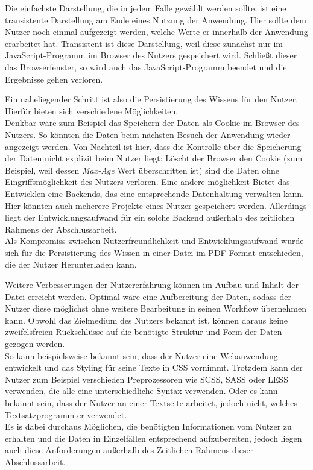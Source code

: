 Die einfachste Darstellung, die in jedem Falle gewählt werden sollte, ist eine transistente Darstellung am Ende eines Nutzung der Anwendung. Hier sollte dem Nutzer noch einmal aufgezeigt werden, welche Werte er innerhalb der Anwendung erarbeitet hat. Transistent ist diese Darstellung, weil diese zunächst nur im JavaScript-Programm im Browser des Nutzers gespeichert wird. Schließt dieser das Browserfenster, so wird auch das JavaScript-Programm beendet und die Ergebnisse gehen verloren.

Ein naheliegender Schritt ist also die Persistierung des Wissens für den Nutzer. Hierfür bieten sich verschiedene Möglichkeiten. \\
Denkbar wäre zum Beispiel das Speichern der Daten als Cookie im Browser des Nutzers. So könnten die Daten beim nächsten Besuch der Anwendung wieder angezeigt werden. Von Nachteil ist hier, dass die Kontrolle über die Speicherung der Daten nicht explizit beim Nutzer liegt: Löscht der Browser den Cookie (zum Beispiel, weil dessen \textit{Max-Age}\footnotemark{} Wert überschritten ist) sind die Daten ohne Eingriffsmöglichkeit des Nutzers verloren.
Eine andere möglichkeit Bietet das Entwicklen eine Backends, das eine entsprechende Datenhaltung verwalten kann. Hier könnten auch meherere Projekte eines Nutzer gespeichert werden. Allerdings liegt der Entwicklungsaufwand für ein solche Backend außerhalb des zeitlichen Rahmens der Abschlussarbeit. \\
Als Kompromiss zwischen Nutzerfreundlichkeit und Entwicklungsaufwand wurde sich für die Persistierung des Wissen in einer Datei im PDF-Format entschieden, die der Nutzer Herunterladen kann.


Weitere Verbesserungen der Nutzererfahrung können im Aufbau und Inhalt der Datei erreicht werden. Optimal wäre eine Aufbereitung der Daten, sodass der Nutzer diese möglichst ohne weitere Bearbeitung in seinen Workflow übernehmen kann. Obwohl das Zielmedium des Nutzers bekannt ist, können daraus keine zweifelsfreien Rückschlüsse auf die benötigte Struktur und Form der Daten gezogen werden. \\
So kann beispielsweise bekannt sein, dass der Nutzer eine Webanwendung entwickelt und das Styling für seine Texte in CSS vornimmt. Trotzdem kann der Nutzer zum Beispiel verschieden Preprozessoren wie SCSS, SASS oder LESS verwenden, die alle eine unterschiedliche Syntax verwenden.
Oder es kann bekannt sein, dass der Nutzer an einer Textseite arbeitet, jedoch nicht, welches Textsatzprogramm er verwendet\footnotemark{}.\\
Es is dabei durchaus Möglichen, die benötigten Informationen vom Nutzer zu erhalten und die Daten in Einzelfällen entsprechend aufzubereiten, jedoch liegen auch diese Anforderungen außerhalb des Zeitlichen Rahmens dieser Abschlussarbeit.
